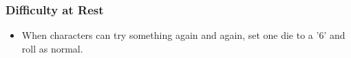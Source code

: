 \subsubsection*{Difficulty at Rest}

\begin{itemize}
  \item
  When characters can try something again and again, set one die to a '6' and roll as normal.
\end{itemize}
